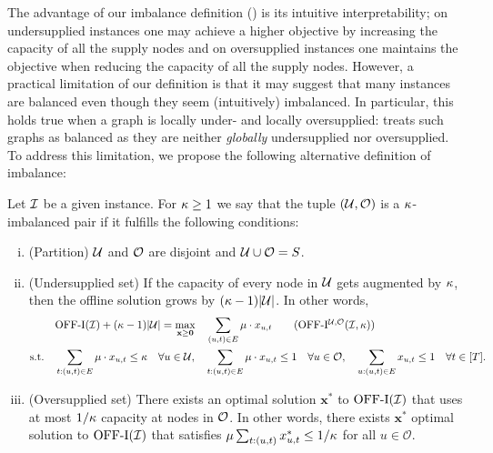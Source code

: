 The advantage of our imbalance definition () is its intuitive  interpretability; on undersupplied instances one may achieve a higher objective by increasing the capacity of all the supply nodes and on oversupplied instances one maintains the objective when reducing the capacity of all the supply nodes. However, a practical limitation of our definition is that it may suggest that many instances are balanced even though they seem (intuitively) imbalanced. In particular, this holds true when a graph is locally under- and locally oversupplied:  treats such graphs as balanced as they are neither \emph{globally} undersupplied nor oversupplied. To address this limitation, we propose the following alternative definition of imbalance:

\begin{definition}
    \label{def: new_over_undersupplied}
    Let $\mathcal I$ be a given instance. For $\kappa \geq 1$ we say that the tuple  $(\mathcal U, \mathcal O)$ is a $\kappa$-imbalanced pair if it fulfills the following conditions:
    \begin{enumerate}[(i)]
        \item (Partition) $\mathcal U$ and $\mathcal O$ are disjoint and $\mathcal U \cup \mathcal O = S$.
        \item (Undersupplied set) If the capacity of every node in $\mathcal U$ gets augmented by $\kappa$, then the offline solution grows by $(\kappa-1) | \mathcal U|$. In other words,
        \begin{align*}
             &\offI(\inst) + (\market-1)|\undersup| = \max_{\mathbf{x}\geq \mathbf{0}} \quad  \sum_{(u, t) \in E}{ \prob \cdot x_{u, t}} \tag{$\offI^{\undersup, \mathcal O}(\inst, \market)$} \label{prob: offlineUndersupplied}\\
    \mathrm{s.t.} \quad & \sum_{t: (u,t) \in E } \prob \cdot  x_{u, t} \leq \market \quad  \forall u \in \undersup, 
    \quad \sum_{t: (u,t) \in E } \prob \cdot  x_{u, t} \leq 1 \quad \forall u \in \oversup,
    \quad \sum_{u: (u,t) \in E} x_{u, t} \leq 1 \quad  \forall t \in [T].
        \end{align*}
        
        \item (Oversupplied set) There exists an optimal solution $\mathbf{x}^*$ to $\mathrm{\mathrm{OFF}}\textrm{-}\mathrm{I}(\mathcal I)$ that uses at most $1/\kappa$ capacity at nodes in $\mathcal O$. In other words, there exists $\mathbf{x}^*$ optimal solution to $\mathrm{\mathrm{OFF}}\textrm{-}\mathrm{I}(\mathcal I)$ that satisfies $\mu \sum_{t: (u,t)} x_{u,t}^* \leq 1/\kappa$ for all $u \in \mathcal O$.
    \end{enumerate}
\end{definition}

